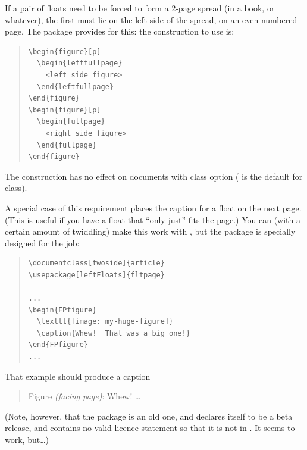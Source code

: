 
If a pair of floats need to be forced to form a 2-page spread (in a
book, or whatever), the first must lie on the left side of the spread,
on an even-numbered page.  The  package provides for
this: the construction to use is:
\begin{quote}
\begin{verbatim}
\begin{figure}[p]
  \begin{leftfullpage}
    <left side figure>
  \end{leftfullpage}
\end{figure}
\begin{figure}[p]
  \begin{fullpage}
    <right side figure>
  \end{fullpage}
\end{figure}
\end{verbatim}
\end{quote}
The construction has no effect on documents with class option
 ( is the default for
 class).

A special case of this requirement places the caption for a float on
the next page.  (This is useful if you have a float that ``only just''
fits the page.)  You can (with a certain amount of twiddling) make
this work with , but the  package is
specially designed for the job:
\begin{quote}
\begin{verbatim}
\documentclass[twoside]{article}
\usepackage[leftFloats]{fltpage}

...
\begin{FPfigure}
  \texttt{[image: my-huge-figure]}
  \caption{Whew!  That was a big one!}
\end{FPfigure}
...

\end{verbatim}
\end{quote}
That example should produce a caption
\begin{quote}
  Figure  \emph{(facing page)}: Whew!  \dots{}
\end{quote}
(Note, however, that the package is an old one, and declares itself to
be a beta release, and contains no valid licence statement so that it
is not in \texlive{}.  It seems to work, but\dots{})

